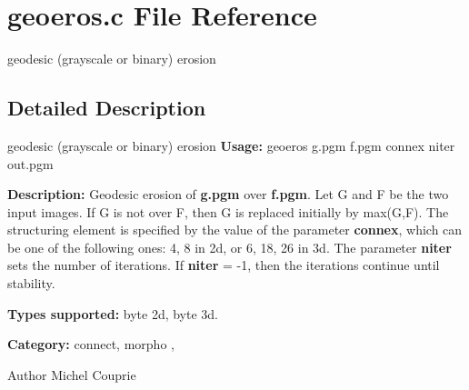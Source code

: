 \section{geoeros.c File Reference}
\label{geoeros_8c}


geodesic (grayscale or binary) erosion  




\subsection{Detailed Description}
geodesic (grayscale or binary) erosion {\bfseries Usage:} geoeros g.pgm f.pgm connex niter out.pgm

{\bfseries Description:} Geodesic erosion of {\bfseries g.pgm} over {\bfseries f.pgm}. Let G and F be the two input images. If G is not over F, then G is replaced initially by max(G,F). The structuring element is specified by the value of the parameter {\bfseries connex}, which can be one of the following ones: 4, 8 in 2d, or 6, 18, 26 in 3d. The parameter {\bfseries niter} sets the number of iterations. If {\bfseries niter} = -\/1, then the iterations continue until stability.

{\bfseries Types supported:} byte 2d, byte 3d.

{\bfseries Category:} connect, morpho ,

\begin{DoxyAuthor}{Author}
Michel Couprie 
\end{DoxyAuthor}
